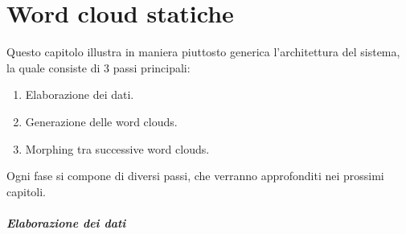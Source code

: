 \onehalfspacing


\chapter{Word cloud statiche}

Questo capitolo illustra in maniera piuttosto generica l'architettura del sistema, la quale consiste di 3 passi principali: 
\begin{enumerate}
\item Elaborazione dei dati.
\item Generazione delle word clouds.
\item Morphing tra successive word clouds.
\end{enumerate}
Ogni fase si compone di diversi passi, che verranno approfonditi nei prossimi capitoli.

\paragraph{Elaborazione dei dati}